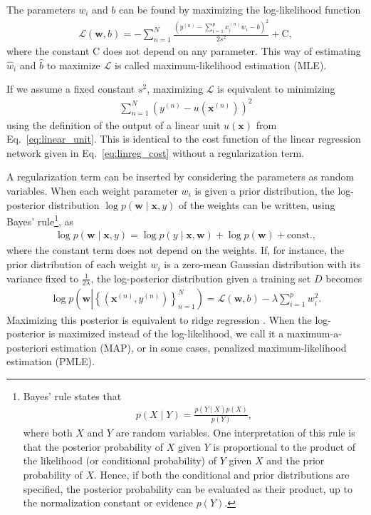 \documentclass[dissertation,nocontribution,draft*]{aaltoseries}
\newcommand{\vect}[1]{\mathbf{#1}}
\newcommand{\vx}[0]{\vect{x}}
\newcommand{\vw}[0]{\vect{w}}
\newcommand{\LL}[0]{\mathcal{L}}
\begin{document}
The parameters $w_i$ and $b$ can be found by maximizing
the log-likelihood function
\begin{align}
    \label{eq:linreg_ll}
    \LL(\vw, b) = -\sum_{n=1}^N \frac{\left( y^{(n)} -
    \sum_{i=1}^p x_i^{(n)} w_i - b \right)^2}{2 s^2} +
    \text{C},
\end{align}
where the constant $\text{C}$ does not depend on any parameter.
This way of estimating $\hat{w}_i$ and $\hat{b}$ to
maximize $\LL$ is called maximum-likelihood estimation
(MLE).

If we assume a fixed constant $s^2$, maximizing $\LL$ is
equivalent to minimizing
\begin{align*}
    \sum_{n=1}^N \left( y^{(n)} -
    u(\vx^{(n)})\right)^2
\end{align*}
using the definition of the output of a linear unit $u(\vx)$
from Eq.~\eqref{eq:linear_unit}. This is identical to the
cost function of the linear regression network given in
Eq.~\eqref{eq:linreg_cost} without a regularization term. 

A regularization term can be inserted by considering the
parameters as random variables. When each weight parameter
$w_i$ is given a prior distribution, the log-posterior
distribution $\log p(\vw \mid \vx, y)$ of the weights can be
written, using Bayes' rule\footnote{Bayes' rule states
that
\begin{align}
    \label{eq:bayes_rule}
    p(X \mid Y) = \frac{p(Y \mid X) p(X)}{p(Y)},
\end{align}
where both $X$ and $Y$ are random variables. One
interpretation of this rule is that the posterior
probability of $X$ given $Y$ is proportional to the product
of the likelihood (or conditional probability) of $Y$ given
$X$ and the prior probability of $X$. Hence, if both the
conditional and prior distributions are specified, the
posterior probability can be evaluated as their product, up
to the normalization constant or evidence $p(Y)$.}, as
\begin{align*}
    \log p(\vw \mid \vx, y) = \log p(y \mid \vx, \vw) + \log
    p(\vw) + \text{const.},
\end{align*}
where the constant term does not depend on the weights. If,
for instance, the prior distribution of each weight $w_i$ is
a zero-mean Gaussian distribution with its variance fixed to
$\tfrac{1}{2\lambda}$, the log-posterior distribution given
a training set $D$ becomes
\begin{align*}
    \log p\left(\vw \left| \left\{ (\vx^{(n)}, y^{(n)})
    \right\}_{n=1}^N \right. \right) = \LL(\vw, b) - \lambda
    \sum_{i=1}^p w_i^2.
\end{align*}
Maximizing this posterior is equivalent to ridge regression
\citep{Hoerl1970}. When the log-posterior is maximized
instead of the log-likelihood, we call it a
maximum-a-posteriori estimation
(MAP), or
in some cases, penalized maximum-likelihood estimation
(PMLE).
\end{document}
